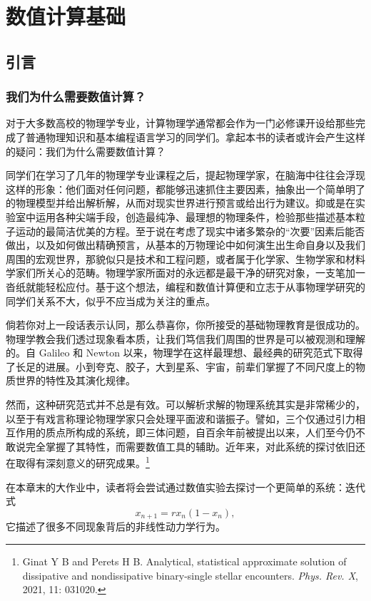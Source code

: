 \chapter{数值计算基础}
\label{chap:numerical-basics}

\section{引言}

\subsection{我们为什么需要数值计算？}

对于大多数高校的物理学专业，计算物理学通常都会作为一门必修课开设给那些完成了普通物理知识和基本编程语言学习的同学们。拿起本书的读者或许会产生这样的疑问：我们为什么需要数值计算？

同学们在学习了几年的物理学专业课程之后，提起物理学家，在脑海中往往会浮现这样的形象：他们面对任何问题，都能够迅速抓住主要因素，抽象出一个简单明了的物理模型并给出解析解，从而对现实世界进行预言或给出行为建议。抑或是在实验室中运用各种尖端手段，创造最纯净、最理想的物理条件，检验那些描述基本粒子运动的最简洁优美的方程。至于说在考虑了现实中诸多繁杂的“次要”因素后能否做出，以及如何做出精确预言，从基本的万物理论中如何演生出生命自身以及我们周围的宏观世界，那貌似只是技术和工程问题，或者属于化学家、生物学家和材料学家们所关心的范畴。物理学家所面对的永远都是最干净的研究对象，一支笔加一沓纸就能轻松应付。基于这个想法，编程和数值计算便和立志于从事物理学研究的同学们关系不大，似乎不应当成为关注的重点。

倘若你对上一段话表示认同，那么恭喜你，你所接受的基础物理教育是很成功的。物理学教会我们透过现象看本质，让我们笃信我们周围的世界是可以被观测和理解的。自 Galileo 和 Newton 以来，物理学在这样最理想、最经典的研究范式下取得了长足的进展。小到夸克、胶子，大到星系、宇宙，前辈们掌握了不同尺度上的物质世界的特性及其演化规律。

然而，这种研究范式并不总是有效。可以解析求解的物理系统其实是非常稀少的，以至于有戏言称理论物理学家只会处理平面波和谐振子。譬如，三个仅通过引力相互作用的质点所构成的系统，即三体问题，自百余年前被提出以来，人们至今仍不敢说完全掌握了其特性，而需要数值工具的辅助。近年来，对此系统的探讨依旧还在取得有深刻意义的研究成果。\footnote{Ginat Y B and Perets H B. Analytical, statistical approximate solution of dissipative and nondissipative binary-single stellar encounters. \textit{Phys. Rev. X}, 2021, 11: 031020.}

在本章末的大作业中，读者将会尝试通过数值实验去探讨一个更简单的系统：迭代式
\[
x_{n+1}=r x_n(1-x_n),
\]
它描述了很多不同现象背后的非线性动力学行为。

